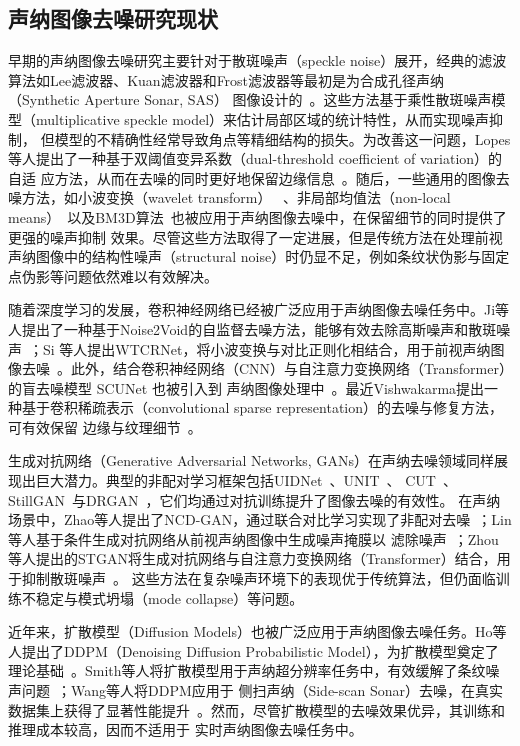 \subsection{声纳图像去噪研究现状}

早期的声纳图像去噪研究主要针对于散斑噪声（speckle noise）展开，经典的滤波算法如Lee滤波器、Kuan滤波器和Frost滤波器等最初是为合成孔径声纳（Synthetic Aperture Sonar, SAS）
图像设计的~\cite{mascarenhas1997overview}。这些方法基于乘性散斑噪声模型（multiplicative speckle model）来估计局部区域的统计特性，从而实现噪声抑制，
但模型的不精确性经常导致角点等精细结构的损失。为改善这一问题，Lopes等人提出了一种基于双阈值变异系数（dual-threshold coefficient of variation）的自适
应方法，从而在去噪的同时更好地保留边缘信息~\cite{lopes2002adaptive}。随后，一些通用的图像去噪方法，如小波变换（wavelet transform）~\cite{chang2000adaptive}
、非局部均值法（non-local means）~\cite{buades2005non}以及BM3D算法~\cite{dabov2007image}也被应用于声纳图像去噪中，在保留细节的同时提供了更强的噪声抑制
效果。尽管这些方法取得了一定进展，但是传统方法在处理前视声纳图像中的结构性噪声（structural noise）时仍显不足，例如条纹状伪影与固定点伪影等问题依然难以有效解决。

随着深度学习的发展，卷积神经网络已经被广泛应用于声纳图像去噪任务中。Ji等人提出了一种基于Noise2Void的自监督去噪方法，能够有效去除高斯噪声和散斑噪声~\cite{ji2025sonar}；Si
等人提出WTCRNet，将小波变换与对比正则化相结合，用于前视声纳图像去噪~\cite{si2024wtcrnet}。此外，结合卷积神经网络（CNN）与自注意力变换网络（Transformer）的盲去噪模型 SCUNet 也被引入到
声纳图像处理中~\cite{zhang2023practical}。最近Vishwakarma提出一种基于卷积稀疏表示（convolutional sparse representation）的去噪与修复方法，可有效保留
边缘与纹理细节~\cite{vishwakarma2023denoising}。

生成对抗网络（Generative Adversarial Networks, GANs）在声纳去噪领域同样展现出巨大潜力。典型的非配对学习框架包括UIDNet~\cite{hong2020end}、UNIT~\cite{liu2017unsupervised}、
CUT~\cite{park2020contrastive}、StillGAN~\cite{ma2021structure}与DRGAN~\cite{huang2020noise}，它们均通过对抗训练提升了图像去噪的有效性。
在声纳场景中，Zhao等人提出了NCD-GAN，通过联合对比学习实现了非配对去噪~\cite{zhao2023unpaired}；Lin等人基于条件生成对抗网络从前视声纳图像中生成噪声掩膜以
滤除噪声~\cite{lin2023conditional}；Zhou 等人提出的STGAN将生成对抗网络与自注意力变换网络（Transformer）结合，用于抑制散斑噪声~\cite{zhou2023stgan}。
这些方法在复杂噪声环境下的表现优于传统算法，但仍面临训练不稳定与模式坍塌（mode collapse）等问题。

近年来，扩散模型（Diffusion Models）也被广泛应用于声纳图像去噪任务。Ho等人提出了DDPM（Denoising Diffusion Probabilistic Model），为扩散模型奠定了
理论基础~\cite{ho2020denoising}。Smith等人将扩散模型用于声纳超分辨率任务中，有效缓解了条纹噪声问题~\cite{bryan2025diffusion}；Wang等人将DDPM应用于
侧扫声纳（Side-scan Sonar）去噪，在真实数据集上获得了显著性能提升~\cite{yang2023side}。然而，尽管扩散模型的去噪效果优异，其训练和推理成本较高，因而不适用于
实时声纳图像去噪任务中。

